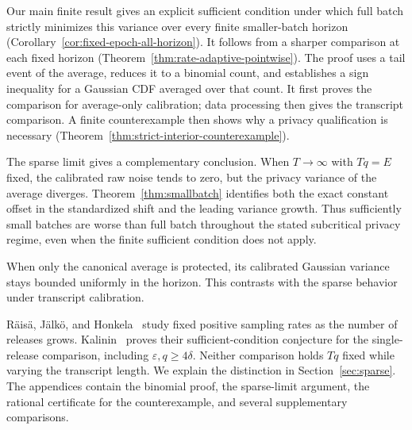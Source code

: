 \documentclass[11pt]{article}
\theoremstyle{remark}
\begin{document}
Our main finite result gives an explicit sufficient condition under which
full batch strictly minimizes this variance over every finite smaller-batch
horizon (Corollary~\ref{cor:fixed-epoch-all-horizon}). It follows from a
sharper comparison at each fixed horizon
(Theorem~\ref{thm:rate-adaptive-pointwise}). The proof uses a tail event
of the average, reduces it to a binomial count, and establishes a sign inequality for a Gaussian CDF averaged over
that count. It first proves the comparison for average-only calibration;
data processing then gives the transcript comparison. A finite
counterexample then shows why a privacy qualification is necessary
(Theorem~\ref{thm:strict-interior-counterexample}).

The sparse limit gives a complementary conclusion. When $T\to\infty$ with
$Tq=E$ fixed, the calibrated raw noise tends to zero, but the privacy variance
of the average diverges. Theorem~\ref{thm:smallbatch} identifies both the exact
constant offset in the standardized shift and the leading variance growth.
Thus sufficiently small batches are worse than full batch throughout the
stated subcritical privacy regime, even when the finite sufficient condition
does not apply.

When only the canonical average is protected, its calibrated Gaussian
variance stays bounded uniformly in the horizon. This contrasts with the
sparse behavior under transcript calibration.

R\"ais\"a, J\"alk\"o, and Honkela~\cite{raisa2024} study fixed positive
sampling rates as the number of releases grows. Kalinin~\cite{kalinin2024}
proves their sufficient-condition conjecture for the single-release
comparison, including $\varepsilon,q\geq4\delta$. Neither comparison holds
$Tq$ fixed while varying the transcript length. We explain the distinction
in Section~\ref{sec:sparse}. The appendices contain the binomial proof,
the sparse-limit argument, the rational certificate for the counterexample,
and several supplementary comparisons.
\end{document}
